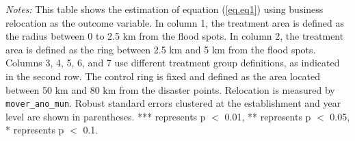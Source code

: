 \begin{table}[htb]
{\begin{threeparttable}
\begin{tabular}{lccccccccccccccc}
\bottomrule
    \end{tabular}%
        \begin{tablenotes}[flushleft] \item \small \textit{Notes:} This table shows the estimation of equation (\ref{eq.eq1}) using business relocation as the outcome variable. In column 1, the treatment area is defined as the radius between 0 to 2.5 km from the flood spots. In column 2, the treatment area is defined as the ring between 2.5 km and 5 km from the flood spots. Columns 3, 4, 5, 6, and 7 use different treatment group definitions, as indicated in the second row. The control ring is fixed and defined as the area located between 50 km and 80 km from the disaster points. Relocation is measured by \texttt{mover\_ano\_mun}. Robust standard errors clustered at the establishment and year level are shown in parentheses. *** represents p $<$ 0.01, ** represents p $<$ 0.05, * represents p $<$ 0.1.
        \end{tablenotes}
        \end{threeparttable}
        }
\end{table}%
